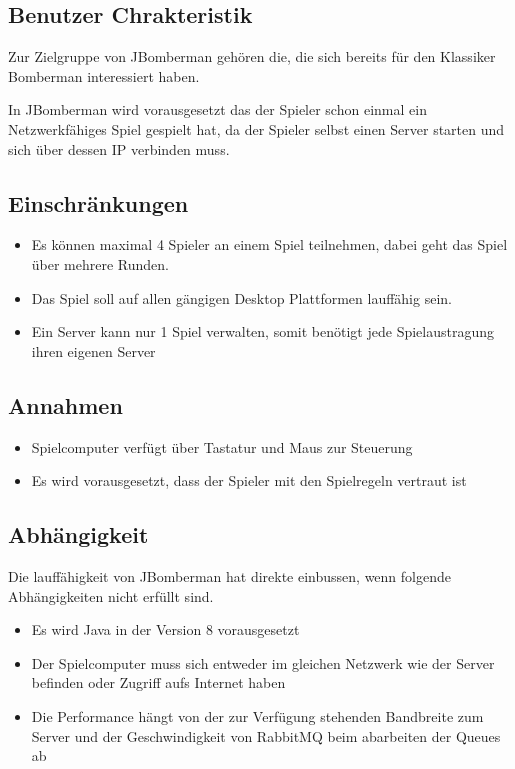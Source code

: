\documentclass[11pt]{scrartcl}
\begin{document}
\subsection{Benutzer Chrakteristik}
\label{sec:Benutzer Chrakteristik}
Zur Zielgruppe von JBomberman gehören die, die  sich bereits für den Klassiker Bomberman interessiert haben.

In JBomberman wird vorausgesetzt das der Spieler schon einmal ein Netzwerkfähiges Spiel gespielt hat, da der Spieler selbst einen Server starten und sich über dessen IP verbinden muss.
\subsection{Einschränkungen}
\label{sec:Einschränkungen}
\begin{itemize}
    \item Es können maximal 4 Spieler an einem Spiel teilnehmen, dabei geht das Spiel über mehrere Runden.
    \item Das Spiel soll auf allen gängigen Desktop Plattformen lauffähig sein.
    \item Ein Server kann nur 1 Spiel verwalten, somit benötigt jede Spielaustragung ihren eigenen Server
\end{itemize}
\subsection{Annahmen}
\label{sec:Annahmen}
\begin{itemize}
    \item Spielcomputer verfügt über Tastatur und Maus zur Steuerung
    \item Es wird vorausgesetzt, dass der Spieler mit den Spielregeln vertraut ist
\end{itemize}

\subsection{Abhängigkeit}
\label{sec:Abhängigkeit}
Die lauffähigkeit von JBomberman hat direkte einbussen, wenn folgende Abhängigkeiten nicht erfüllt sind.
\begin{itemize}
    \item Es wird Java in der Version 8 vorausgesetzt
    \item Der Spielcomputer muss sich entweder im gleichen Netzwerk wie der Server befinden oder Zugriff aufs Internet haben
    \item Die Performance hängt von der zur Verfügung stehenden Bandbreite zum Server und der Geschwindigkeit von RabbitMQ beim abarbeiten der Queues ab
\end{itemize}
\end{document}

